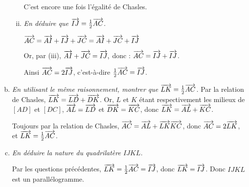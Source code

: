 \documentclass[11pt]{article}
\begin{document}
\begin{exercice}[5 points]
\begin{enumerate}[(a)]
\begin{enumerate}[(i)]
            C'est encore une fois l'égalité de Chasles.
          \item \emph{En déduire que $\overrightarrow{IJ}=\frac{1}{2}\overrightarrow{AC}$.}

            $\overrightarrow{AC}=\overrightarrow{AI}+\overrightarrow{IJ}+\overrightarrow{JC} = \overrightarrow{AI}+\overrightarrow{JC}+\overrightarrow{IJ}$

            Or, par (iii), $\overrightarrow{AI}+\overrightarrow{JC}=\overrightarrow{IJ},$ donc :
            $\overrightarrow{AC}=\overrightarrow{IJ}+\overrightarrow{IJ}$.

            Ainsi $\overrightarrow{AC}=2\overrightarrow{IJ}$, c'est-à-dire $\frac{1}{2}\overrightarrow{AC}=\overrightarrow{IJ}$.
        \end{enumerate}
    \item \emph{En utilisant le même raisonnement, montrer que $\overrightarrow{LK}=\frac{1}{2}\overrightarrow{AC}$.}
      Par la relation de Chasles, $\overrightarrow{LK}=\overrightarrow{LD}+\overrightarrow{DK}$. Or, $L$ et $K$ étant respectivement les milieux de $[AD]$ et $[DC]$, $\overrightarrow{AL}=\overrightarrow{LD}$ et $\overrightarrow{DK}=\overrightarrow{KC}$, donc $\overrightarrow{LK}=\overrightarrow{AL}+\overrightarrow{KC}$.

      Toujours par la relation de Chasles, $\overrightarrow{AC}=\overrightarrow{AL}+\overrightarrow{LK}\overrightarrow{KC}$, donc $\overrightarrow{AC}=2\overrightarrow{LK}$, et $\overrightarrow{LK}=\frac{1}{2}\overrightarrow{AC}$.
    \item \emph{En déduire la nature du quadrilatère $IJKL$.}

      Par les questions précédentes, $\overrightarrow{LK}=\frac{1}{2}\overrightarrow{AC}=\overrightarrow{IJ}$, donc $\overrightarrow{LK}=\overrightarrow{IJ}$. Donc $IJKL$ est un parallélogramme.
  \end{enumerate}
\end{exercice}
\end{document}
